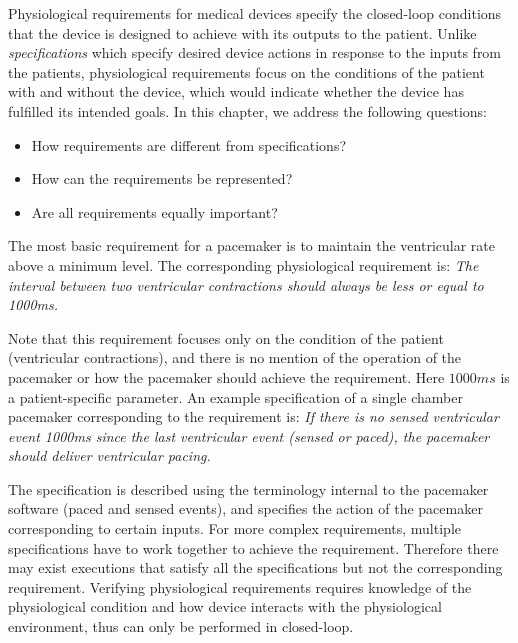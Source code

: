Physiological requirements for medical devices specify the closed-loop conditions that the device is designed to achieve with its outputs to the patient. Unlike \emph{specifications} which specify desired device actions in response to the inputs from the patients, physiological requirements focus on the conditions of the patient with and without the device, which would indicate whether the device has fulfilled its intended goals. In this chapter, we address the following questions:
\begin{itemize}
	\vspace{-5pt}
	\item How requirements are different from specifications?
	\vspace{-5pt}
 	\item How can the requirements be represented?
	\vspace{-5pt}
	\item Are all requirements equally important?
\end{itemize}


The most basic requirement for a pacemaker is to maintain the ventricular rate above a minimum level. The corresponding physiological requirement is:
\noindent
 \emph{The interval between two ventricular contractions should always be less or equal to 1000ms.} 

Note that this requirement focuses only on the condition of the patient (ventricular contractions), and there is no mention of the operation of the pacemaker or how the pacemaker should achieve the requirement. Here $1000ms$ is a patient-specific parameter. An example specification of a single chamber pacemaker corresponding to the requirement is:  
\noindent
\emph{If there is no sensed ventricular event 1000ms since the last ventricular event (sensed or paced), the pacemaker should deliver ventricular pacing.}
 
The specification is described using the terminology internal to the pacemaker software (paced and sensed events), and specifies the action of the pacemaker corresponding to certain inputs. For more complex requirements, multiple specifications have to work together to achieve the requirement. Therefore there may exist executions that satisfy all the specifications but not the corresponding requirement. Verifying physiological requirements requires knowledge of the physiological condition and how device interacts with the physiological environment, thus can only be performed in closed-loop. 

